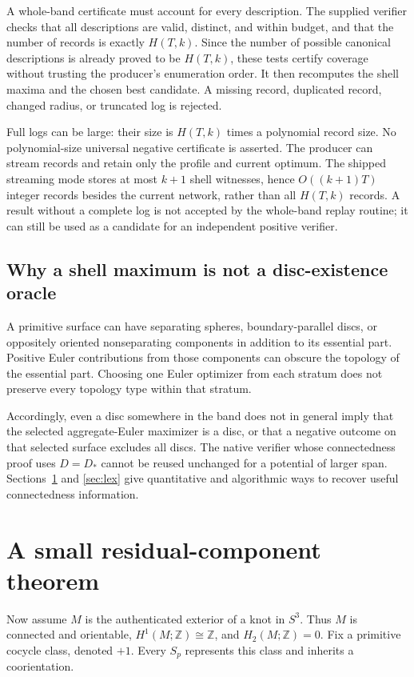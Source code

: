 \documentclass[11pt,letterpaper]{article}
\theoremstyle{definition}
\newcommand{\Z}{\mathbb Z}
\begin{document}
A whole-band certificate must account for every description. The supplied verifier checks that all descriptions are valid, distinct, and within budget, and that the number of records is exactly $H(T,k)$. Since the number of possible canonical descriptions is already proved to be $H(T,k)$, these tests certify coverage without trusting the producer's enumeration order. It then recomputes the shell maxima and the chosen best candidate. A missing record, duplicated record, changed radius, or truncated log is rejected.

Full logs can be large: their size is $H(T,k)$ times a polynomial record size. No polynomial-size universal negative certificate is asserted. The producer can stream records and retain only the profile and current optimum. The shipped streaming mode stores at most $k+1$ shell witnesses, hence $O((k+1)T)$ integer records besides the current network, rather than all $H(T,k)$ records. A result without a complete log is not accepted by the whole-band replay routine; it can still be used as a candidate for an independent positive verifier.

\subsection{Why a shell maximum is not a disc-existence oracle}
A primitive surface can have separating spheres, boundary-parallel discs, or oppositely oriented nonseparating components in addition to its essential part. Positive Euler contributions from those components can obscure the topology of the essential part. Choosing one Euler optimizer from each stratum does not preserve every topology type within that stratum.

Accordingly, even a disc somewhere in the band does not in general imply that the selected aggregate-Euler maximizer is a disc, or that a negative outcome on that selected surface excludes all discs. The native verifier whose connectedness proof uses $D=D_*$ cannot be reused unchanged for a potential of larger span. Sections~\ref{sec:core} and \ref{sec:lex} give quantitative and algorithmic ways to recover useful connectedness information.

\section{A small residual-component theorem}\label{sec:core}
Now assume $M$ is the authenticated exterior of a knot in $S^3$. Thus $M$ is connected and orientable, $H^1(M;\Z)\cong\Z$, and $H_2(M;\Z)=0$. Fix a primitive cocycle class, denoted $+1$. Every $S_p$ represents this class and inherits a coorientation.
\end{document}
